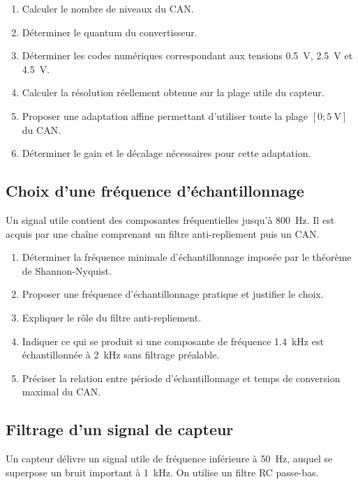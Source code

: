 \begin{enumerate}
  \item Calculer le nombre de niveaux du CAN.
  \item Déterminer le quantum du convertisseur.
  \item Déterminer les codes numériques correspondant aux tensions \SI{0.5}{\volt}, \SI{2.5}{\volt} et \SI{4.5}{\volt}.
  \item Calculer la résolution réellement obtenue sur la plage utile du capteur.
  \item Proposer une adaptation affine permettant d'utiliser toute la plage $[0;\SI{5}{\volt}]$ du CAN.
  \item Déterminer le gain et le décalage nécessaires pour cette adaptation.
\end{enumerate}

\subsection{Choix d'une fréquence d'échantillonnage}

Un signal utile contient des composantes fréquentielles jusqu'à \SI{800}{\hertz}. Il est acquis par une chaîne comprenant un filtre anti-repliement puis un CAN.

\begin{enumerate}
  \item Déterminer la fréquence minimale d'échantillonnage imposée par le théorème de Shannon-Nyquist.
  \item Proposer une fréquence d'échantillonnage pratique et justifier le choix.
  \item Expliquer le rôle du filtre anti-repliement.
  \item Indiquer ce qui se produit si une composante de fréquence \SI{1.4}{\kilo\hertz} est échantillonnée à \SI{2}{\kilo\hertz} sans filtrage préalable.
  \item Préciser la relation entre période d'échantillonnage et temps de conversion maximal du CAN.
\end{enumerate}

\subsection{Filtrage d'un signal de capteur}

Un capteur délivre un signal utile de fréquence inférieure à \SI{50}{\hertz}, auquel se superpose un bruit important à \SI{1}{\kilo\hertz}. On utilise un filtre RC passe-bas.

